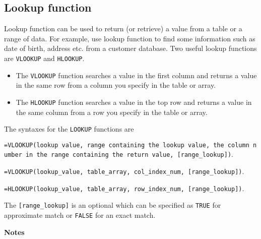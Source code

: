 \documentclass[
]{article}
\theoremstyle{definition}
\theoremstyle{definition}
\theoremstyle{definition}
\theoremstyle{definition}
\theoremstyle{remark}
\begin{document}
\hypertarget{lookup-function}{%
\subsection{Lookup function}\label{lookup-function}}

Lookup function can be used to return (or retrieve) a value from a table
or a range of data. For example, use lookup function to find some
information such as date of birth, address etc. from a customer
database. Two useful lookup functions are \texttt{VLOOKUP} and \texttt{HLOOKUP}.

\begin{itemize}
\item
  The \texttt{VLOOKUP} function searches a value in the first column and
  returns a value in the same row from a column you specify in the
  table or array.
\item
  The \texttt{HLOOKUP} function searches a value in the top row and returns a
  value in the same column from a row you specify in the table or
  array.
\end{itemize}

The syntaxes for the \texttt{LOOKUP} functions are

\texttt{=VLOOKUP(lookup\ value,\ range\ containing\ the\ lookup\ value,\ the\ column\ number\ in\ the\ range\ containing\ the\ return\ value,\ {[}range\_lookup{]})}.

\texttt{=VLOOKUP(lookup\_value,\ table\_array,\ col\_index\_num,\ {[}range\_lookup{]})}.

\texttt{=HLOOKUP(lookup\_value,\ table\_array,\ row\_index\_num,\ {[}range\_lookup{]})}.

The \texttt{{[}range\_lookup{]}} is an optional which can be specified as \texttt{TRUE} for
approximate match or \texttt{FALSE} for an exact match.

\textbf{Notes}
\end{document}
